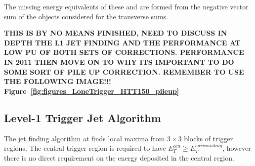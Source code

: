 The missing energy equivalents of these \MET and \MHT are formed from the negative vector sum of the objects considered for the
transverse sums.




% 


\textbf{THIS IS BY NO MEANS FINISHED, NEED TO DISCUSS IN DEPTH THE L1 JET FINDING AND THE PERFORMANCE AT LOW PU OF
BOTH SETS OF CORRECTIONS. PERFORMANCE IN 2011 THEN MOVE ON TO WHY ITS IMPORTANT TO DO SOME SORT OF PILE UP
CORRECTION. REMEMBER TO USE THE FOLLOWING IMAGE!!! Figure~\ref{fig:figures_LoneTrigger_HTT150_pileup}}




\subsection{Level-1 Trigger Jet Algorithm} %
\label{sec:Level-1 Trigger Jet Algorythm}

The jet finding algorithm \cite{gctcomm} at \Lone finds local maxima from $3\times3$ blocks of trigger regions. The central trigger region
is required to have $E_{T}^{cen} \geq E_{T}^{surrounding}$, however there is no direct requirement on the energy deposited in the central
region.



